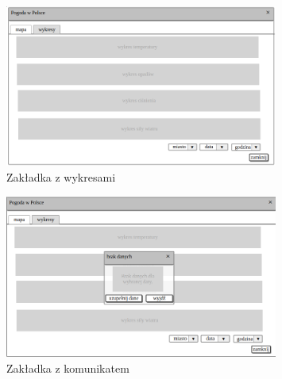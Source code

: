 \documentclass[10pt, a4paper]{article}
\begin{document}
\begin{figure}[h]
    \centering
	\includegraphics[width=0.80\textwidth]{rysunek_wykresy.png}
	\caption{Zakładka z wykresami}
\end{figure}

\begin{figure}[h]
    \centering
	\includegraphics[width=0.80\textwidth]{rysunek_brak_danych.png}
	\caption{Zakładka z komunikatem}
\end{figure}
\end{document}

